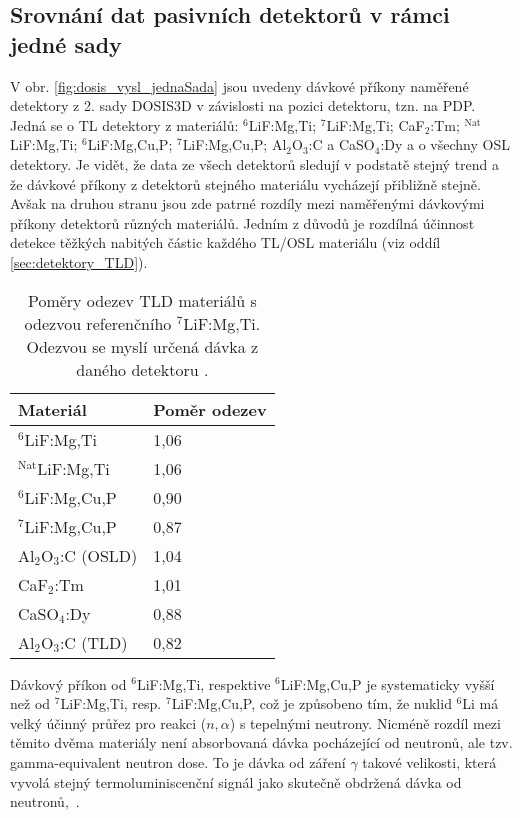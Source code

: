 \subsection{Srovnání dat pasivních detektorů v rámci jedné sady}
V obr. \ref{fig:dosis_vysl_jednaSada} jsou uvedeny dávkové příkony naměřené detektory z 2. sady DOSIS3D v závislosti na pozici detektoru, tzn. na PDP. Jedná se o TL detektory z materiálů: $^6$LiF:Mg,Ti; $^7$LiF:Mg,Ti; CaF$_2$:Tm; $^{\text{Nat}}$LiF:Mg,Ti; $^6$LiF:Mg,Cu,P; $^7$LiF:Mg,Cu,P; Al$_2$O$_3$:C a CaSO$_4$:Dy a o všechny OSL detektory. Je vidět, že data ze všech detektorů sledují v podstatě stejný trend a že dávkové příkony z detektorů stejného materiálu vycházejí přibližně stejně. Avšak na druhou stranu jsou zde patrné rozdíly mezi naměřenými dávkovými příkony detektorů různých materiálů. Jedním z důvodů je rozdílná účinnost detekce těžkých nabitých částic každého TL/OSL materiálu (viz oddíl \ref{sec:detektory_TLD}).
\begin{table}[H]
  \centering
  \def\arraystretch{0.8}
  \caption{Poměry odezev TLD materiálů s odezvou referenčního $^7$LiF:Mg,Ti. Odezvou se myslí určená dávka z daného detektoru \cite{dosis}.}
  \label{tab:dosis_TLD_ratio}
  \begin{tabular}{ll}
	\toprule
	Materiál & Poměr odezev\\
	\midrule
$^6$LiF:Mg,Ti		&1,06\\
$^{\text{Nat}}$LiF:Mg,Ti	&1,06\\
$^6$LiF:Mg,Cu,P		&0,90\\
$^7$LiF:Mg,Cu,P		&0,87\\
Al$_2$O$_3$:C (OSLD)&1,04\\ 
CaF$_2$:Tm			&1,01\\
CaSO$_4$:Dy			&0,88\\
Al$_2$O$_3$:C (TLD)	&0,82\\
\bottomrule
  \end{tabular}
\end{table}

Dávkový příkon od $^6$LiF:Mg,Ti, respektive $^6$LiF:Mg,Cu,P je systematicky vyšší než od $^7$LiF:Mg,Ti, resp. $^7$LiF:Mg,Cu,P, což je způsobeno tím, že nuklid $^6$Li má velký účinný průřez pro reakci ($n,\alpha$) s tepelnými neutrony. Nicméně rozdíl mezi těmito dvěma materiály není absorbovaná dávka pocházející od neutronů, ale tzv. gamma-equivalent neutron dose. To je dávka od záření $\gamma$ takové velikosti, která vyvolá stejný termoluminiscenční signál jako skutečně obdržená dávka od neutronů,~\cite{dosis}.

